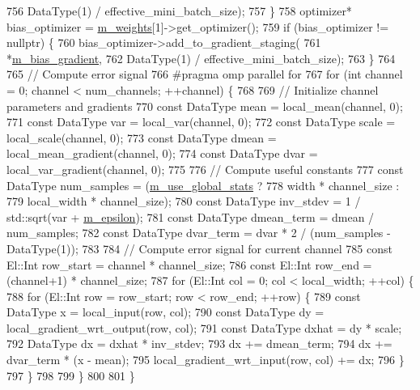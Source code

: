 \begin{DoxyCode}
756         DataType(1) / effective\_mini\_batch\_size);
757     \}
758     optimizer* bias\_optimizer = \hyperlink{classlbann_1_1Layer_a7954e30fbf9100a6ba4b56d02767a469}{m\_weights}[1]->get\_optimizer();
759     \textcolor{keywordflow}{if} (bias\_optimizer != \textcolor{keyword}{nullptr}) \{
760       bias\_optimizer->add\_to\_gradient\_staging(
761         *\hyperlink{classlbann_1_1batch__normalization_aa0f1e9a9f48f67544618e239167494bb}{m\_bias\_gradient},
762         DataType(1) / effective\_mini\_batch\_size);
763     \}
764 
765     \textcolor{comment}{// Compute error signal}
766 \textcolor{preprocessor}{    #pragma omp parallel for}
767     \textcolor{keywordflow}{for} (\textcolor{keywordtype}{int} channel = 0; channel < num\_channels; ++channel) \{
768 
769       \textcolor{comment}{// Initialize channel parameters and gradients}
770       \textcolor{keyword}{const} DataType mean = local\_mean(channel, 0);
771       \textcolor{keyword}{const} DataType var = local\_var(channel, 0);
772       \textcolor{keyword}{const} DataType scale = local\_scale(channel, 0);
773       \textcolor{keyword}{const} DataType dmean = local\_mean\_gradient(channel, 0);
774       \textcolor{keyword}{const} DataType dvar = local\_var\_gradient(channel, 0);
775 
776       \textcolor{comment}{// Compute useful constants}
777       \textcolor{keyword}{const} DataType num\_samples = (\hyperlink{classlbann_1_1batch__normalization_a0a33289150c01899f4b7ef2980771899}{m\_use\_global\_stats} ?
778                                     width * channel\_size :
779                                     local\_width * channel\_size);
780       \textcolor{keyword}{const} DataType inv\_stdev = 1 / std::sqrt(var + \hyperlink{classlbann_1_1batch__normalization_ab82e74f905b7a117d9940f8542451e37}{m\_epsilon});
781       \textcolor{keyword}{const} DataType dmean\_term = dmean / num\_samples;
782       \textcolor{keyword}{const} DataType dvar\_term = dvar * 2 / (num\_samples - DataType(1));
783 
784       \textcolor{comment}{// Compute error signal for current channel}
785       \textcolor{keyword}{const} El::Int row\_start = channel * channel\_size;
786       \textcolor{keyword}{const} El::Int row\_end = (channel+1) * channel\_size;
787       \textcolor{keywordflow}{for} (El::Int col = 0; col < local\_width; ++col) \{
788         \textcolor{keywordflow}{for} (El::Int row = row\_start; row < row\_end; ++row) \{
789           \textcolor{keyword}{const} DataType x = local\_input(row, col);
790           \textcolor{keyword}{const} DataType dy = local\_gradient\_wrt\_output(row, col);
791           \textcolor{keyword}{const} DataType dxhat = dy * scale;
792           DataType dx = dxhat * inv\_stdev;
793           dx += dmean\_term;
794           dx += dvar\_term * (x - mean);
795           local\_gradient\_wrt\_input(row, col) += dx;
796         \}
797       \}
798 
799     \}
800 
801   \}
\end{DoxyCode}
